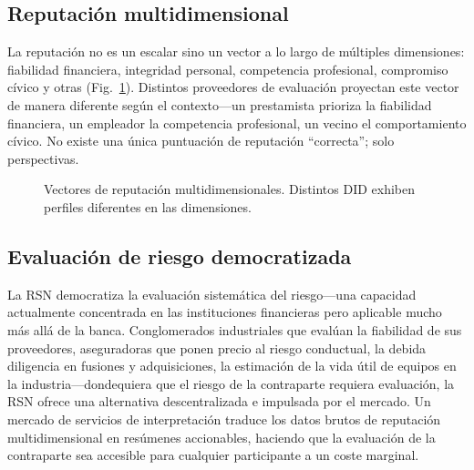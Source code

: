\documentclass[11pt,a4paper,twocolumn]{article}
\begin{document}
\subsection{Reputación multidimensional}

La reputación no es un escalar sino un vector a lo largo de múltiples dimensiones: fiabilidad financiera, integridad personal, competencia profesional, compromiso cívico y otras (Fig.~\ref{fig:reputation-radar}). Distintos proveedores de evaluación proyectan este vector de manera diferente según el contexto---un prestamista prioriza la fiabilidad financiera, un empleador la competencia profesional, un vecino el comportamiento cívico. No existe una única puntuación de reputación ``correcta''; solo perspectivas.

\begin{figure}[ht]
\centering
{}
\caption{Vectores de reputación multidimensionales. Distintos DID exhiben perfiles diferentes en las dimensiones.}
\label{fig:reputation-radar}
\end{figure}

\subsection{Evaluación de riesgo democratizada}

La RSN democratiza la evaluación sistemática del riesgo---una capacidad actualmente concentrada en las instituciones financieras pero aplicable mucho más allá de la banca. Conglomerados industriales que evalúan la fiabilidad de sus proveedores, aseguradoras que ponen precio al riesgo conductual, la debida diligencia en fusiones y adquisiciones, la estimación de la vida útil de equipos en la industria---dondequiera que el riesgo de la contraparte requiera evaluación, la RSN ofrece una alternativa descentralizada e impulsada por el mercado. Un mercado de servicios de interpretación traduce los datos brutos de reputación multidimensional en resúmenes accionables, haciendo que la evaluación de la contraparte sea accesible para cualquier participante a un coste marginal.
\end{document}
